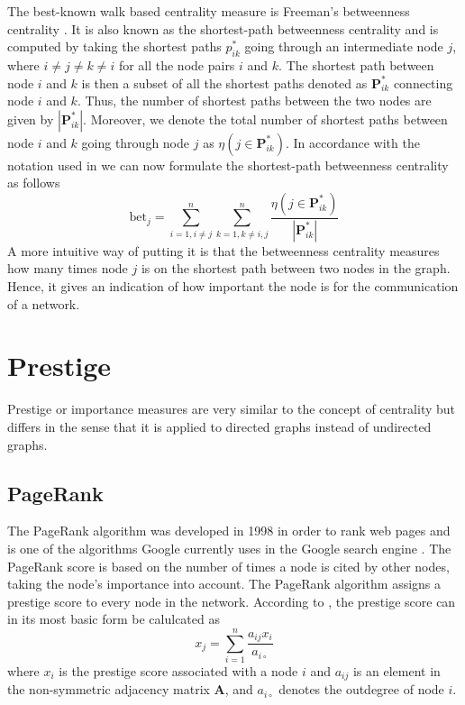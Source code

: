 The best-known walk based centrality measure is Freeman's betweenness centrality \citep{fouss2016algorithms}. It is also known as the shortest-path betweenness centrality and is computed by taking the shortest paths $p_{ik}^*$ going through an intermediate node $j$, where $i\neq j \neq k\neq i$ for all the node pairs $i$ and $k$. The shortest path between node $i$ and $k$ is then a subset of all the shortest paths denoted as $\bm{P}_{ik}^*$ connecting node $i$ and $k$. Thus, the number of shortest paths between the two nodes are given by $|\bm{P}_{ik}^*|$. Moreover, we denote the total number of shortest paths between node $i$ and $k$ going through node $j$ as $\eta(j \in \bm{P}_{ik}^*)$. In accordance with the notation used in \citep{fouss2016algorithms} we can now formulate the shortest-path betweenness centrality as follows
\begin{equation}
    \text{bet}_j=\sum_{i=1, i\neq j}^{n} \sum_{k=1, k \neq i,j}^{n} \frac{\eta(j \in \bm{P}_{ik}^*)}{|\bm{P}_{ik}^*|}
\end{equation}
A more intuitive way of putting it is that the betweenness centrality measures how many times node $j$ is on the shortest path between two nodes in the graph. Hence, it gives an indication of how important the node is for the communication of a network. 

\section{Prestige}
Prestige or importance measures are very similar to the concept of centrality but differs in the sense that it is applied to directed graphs instead of undirected graphs. 

\subsection{PageRank}
The PageRank algorithm was developed in 1998 in order to rank web pages and is one of the algorithms Google currently uses in the Google search engine \cite{langville2004deeperinside,langville2012}. The PageRank score is based on the number of times a node is cited by other nodes, taking the node's importance into account. The PageRank algorithm assigns a prestige score to every node in the network. According to \citet{fouss2016algorithms}, the prestige score can in its most basic form be calulcated as 
\begin{equation}
    x_j=\sum_{i=1}^{n} \frac{a_{ij}x_i}{a_{i\circ}}
\end{equation}
where $x_i$ is the prestige score associated with a node $i$ and $a_{ij}$ is an element in the non-symmetric adjacency matrix $\textbf{A}$, and $a_{i\circ}$ denotes the outdegree of node $i$. 

